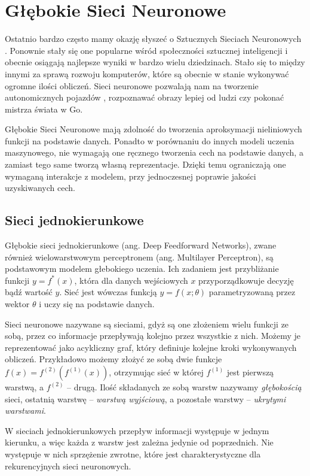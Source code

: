 \documentclass[licencjacka]{pracamgr}
\begin{document}
\chapter{Głębokie Sieci Neuronowe}

Ostatnio bardzo często mamy okazję słyszeć o Sztucznych Sieciach Neuronowych \cite{dlbook}. Ponownie stały się one popularne wśród społeczności sztucznej inteligencji i obecnie osiągają najlepsze wyniki w bardzo wielu dziedzinach. Stało się to między innymi za sprawą rozwoju komputerów, które są obecnie w stanie wykonywać ogromne ilości obliczeń. Sieci neuronowe pozwalają nam na tworzenie autonomicznych pojazdów \cite{sdc1, sdc2}, rozpoznawać obrazy lepiej od ludzi \cite{resnet, resnext} czy pokonać mistrza świata w Go\cite{alphago2016, alphagozero}. 

Głębokie Sieci Neuronowe mają zdolność do tworzenia aproksymacji nieliniowych funkcji na podstawie danych. Ponadto w porównaniu do innych modeli uczenia maszynowego, nie wymagają one ręcznego tworzenia cech na podstawie danych, a zamiast tego same tworzą własną reprezentacje. Dzięki temu ograniczają one wymaganą interakcje z modelem, przy jednoczesnej poprawie jakości uzyskiwanych cech.

\section{Sieci jednokierunkowe}

Głębokie sieci jednokierunkowe (ang. Deep Feedforward Networks), zwane również wielowarstwowym perceptronem (ang. Multilayer Perceptron), są podstawowym modelem głebokiego uczenia. Ich zadaniem jest przybliżanie funkcji $ y = f^{\ast}(x) $, która dla danych wejściowych $x$ przyporządkowuje decyzję bądź wartość $y$. Sieć jest wówczas funkcją $ y = f(x; \theta) $ parametryzowaną przez wektor $\theta$ i uczy się na podstawie danych.

Sieci neuronowe nazywane są sieciami, gdyż są one złożeniem wielu funkcji ze sobą, przez co informacje przepływają kolejno przez wszystkie z nich. Możemy je reprezentować jako acykliczny graf, który definiuje kolejne kroki wykonywanych obliczeń. Przykładowo możemy złożyć ze sobą dwie funkcje $ f(x) = f^{(2)}(f^{(1)}(x)) $, otrzymując sieć w której $f^{(1)} $ jest pierwszą warstwą, a $ f^{(2)} $ -- drugą. Ilość składanych ze sobą warstw nazywamy \emph{głębokością} sieci, ostatnią warstwę -- \emph{warstwą wyjściową}, a pozostałe warstwy -- \emph{ukrytymi warstwami}. 

W sieciach jednokierunkowych przepływ informacji występuje w jednym kierunku, a więc każda z warstw jest zależna jedynie od poprzednich. Nie występuje w nich sprzężenie zwrotne, które jest charakterystyczne dla rekurencyjnych sieci neuronowych.
\end{document}
